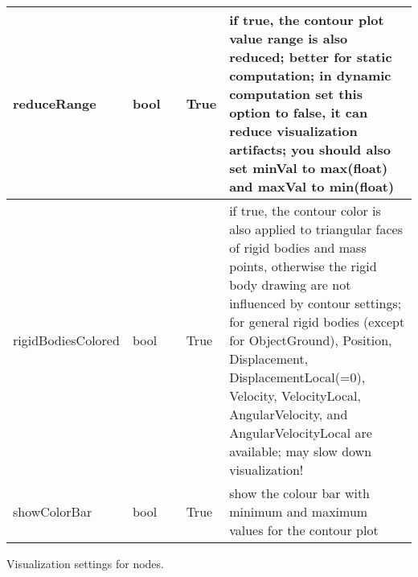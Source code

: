 \begin{center}
\begin{longtable}{| p{4.2cm} | p{2.5cm} | p{0.3cm} | p{3.0cm} | p{6cm} |}
    reduceRange &     bool &      &     True &     if true, the contour plot value range is also reduced; better for static computation; in dynamic computation set this option to false, it can reduce visualization artifacts; you should also set minVal to max(float) and maxVal to min(float)\\ \hline
    rigidBodiesColored &     bool &      &     True &     if true, the contour color is also applied to triangular faces of rigid bodies and mass points, otherwise the rigid body drawing are not influenced by contour settings; for general rigid bodies (except for ObjectGround), Position, Displacement, DisplacementLocal(=0), Velocity, VelocityLocal, AngularVelocity, and AngularVelocityLocal are available; may slow down visualization!\\ \hline
    showColorBar &     bool &      &     True &     show the colour bar with minimum and maximum values for the contour plot\\ \hline
	  \end{longtable}
	\end{center}



\label{sec:VSettingsNodes}
Visualization settings for nodes.

